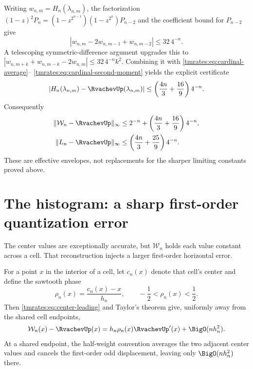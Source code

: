 \documentclass[11pt,oneside]{article}
\theoremstyle{definition}
\theoremstyle{remark}
\begin{document}
Writing $w_{n,m}=H_n(\lambda_{n,m})$, the factorization
$(1-z)^2P_n=(1-z^{2^{n-1}})(1-z^{2^n})P_{n-2}$ and the coefficient bound for
$P_{n-2}$ give
\begin{equation}
 |w_{n,m}-2w_{n,m-1}+w_{n,m-2}|\le32\,4^{-n}.
 \label{tmrates:eq:discrete-curvature}
\end{equation}
A telescoping symmetric-difference argument upgrades this to
$|w_{n,m+k}+w_{n,m-k}-2w_{n,m}|\le32\,4^{-n}k^2$.
Combining it with \eqref{tmrates:eq:cardinal-average}--
\eqref{tmrates:eq:cardinal-second-moment} yields the explicit certificate
\begin{equation}
 |H_n(\lambda_{n,m})-\RvachevUp(\lambda_{n,m})|
 \le\left(\frac{4n}{3}+\frac{16}{9}\right)4^{-n}.
 \label{tmrates:eq:effective-center-bound}
\end{equation}
Consequently
\begin{align}
 \|\mathcal W_n-\RvachevUp\|_\infty
 &\le2^{-n}+\left(\frac{4n}{3}+\frac{16}{9}\right)4^{-n},
 \label{tmrates:eq:effective-histogram-bound}\\
 \|L_n-\RvachevUp\|_\infty
 &\le\left(\frac{4n}{3}+\frac{25}{9}\right)4^{-n}.
 \label{tmrates:eq:effective-linear-bound}
\end{align}
These are effective envelopes, not replacements for the sharper limiting constants proved
above.

\section{The histogram: a sharp first-order quantization error}
\label{tmrates:sec:histogram-rate}

The center values are exceptionally accurate, but $\mathcal W_n$ holds each value constant
across a cell.  That reconstruction injects a larger first-order horizontal error.

For a point $x$ in the interior of a cell, let $c_n(x)$ denote that cell's center and define
the sawtooth phase
\begin{equation}
 \rho_n(x)=\frac{c_n(x)-x}{h_n},
 \qquad -\frac12<\rho_n(x)<\frac12.                       \label{tmrates:eq:rho}
\end{equation}
Then \eqref{tmrates:eq:center-leading} and Taylor's theorem give, uniformly away from the shared cell
endpoints,
\begin{equation}
 \mathcal W_n(x)-\RvachevUp(x)
 =h_n\rho_n(x)\RvachevUp'(x)+\BigO(nh_n^2).                      \label{tmrates:eq:hist-local}
\end{equation}
At a shared endpoint, the half-weight convention averages the two adjacent center values and
cancels the first-order odd displacement, leaving only $\BigO(nh_n^2)$ there.
\end{document}
